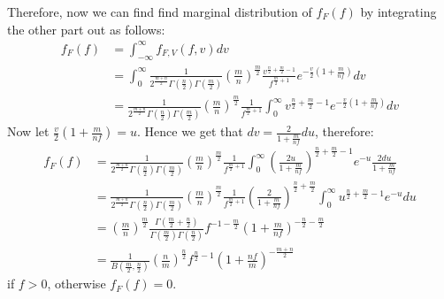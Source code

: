 \documentclass[a4paper]{article}
\begin{document}
Therefore, now we can find find marginal distribution of $f_F\left( f \right) $ by integrating the other part out as follows:
\begin{equation*}
	\begin{split}
		f_F\left( f \right) &=  \int_{-\infty}^{\infty} f_{F,V}\left( f,v \right) dv\\
		&= \int_0^{\infty}  \frac{1}{ 2^{\frac{m+n}{2}}\Gamma\left( \frac{n}{2} \right) \Gamma\left( \frac{m}{2} \right) } \left( \frac{m}{n} \right) ^{\frac{m}{2}} \frac{v^{\frac{n}{2}+\frac{m}{2}-1}}{f^{\frac{m}{2}+1}} e^{-\frac{v}{2}\left( 1+ \frac{m}{nf} \right) }dv\\
		&= \frac{1}{ 2^{\frac{m+n}{2}}\Gamma\left( \frac{n}{2} \right) \Gamma\left( \frac{m}{2} \right) } \left( \frac{m}{n} \right) ^{\frac{m}{2}} \frac{1}{f^{\frac{m}{2}+1}} \int_0^{\infty} v^{\frac{n}{2}+\frac{m}{2}-1}e^{-\frac{v}{2}\left( 1+\frac{m}{nf} \right) }dv
	\end{split}
\end{equation*}
Now let $\frac{v}{2}\left( 1+ \frac{m}{nf} \right) = u$. Hence we get that $dv = \frac{2}{1+\frac{m}{nf}} du$, therefore:
\begin{equation*}
	\begin{split}
		f_F\left( f \right) &= \frac{1}{ 2^{\frac{m+n}{2}}\Gamma\left( \frac{n}{2} \right) \Gamma\left( \frac{m}{2} \right) } \left( \frac{m}{n} \right) ^{\frac{m}{2}} \frac{1}{f^{\frac{m}{2}+1}} \int_0^{\infty} \left( \frac{2u}{1+\frac{m}{nf}} \right) ^{\frac{n}{2}+\frac{m}{2}-1} e^{-u} \frac{2du}{1+\frac{m}{nf}}\\
		&= \frac{1}{ 2^{\frac{m+n}{2}}\Gamma\left( \frac{n}{2} \right) \Gamma\left( \frac{m}{2} \right) } \left( \frac{m}{n} \right) ^{\frac{m}{2}} \frac{1}{f^{\frac{m}{2}+1}} \left( \frac{2}{1+\frac{m}{nf}} \right) ^{\frac{n}{2}+\frac{m}{2}} \int_0^{\infty} u^{\frac{n}{2}+\frac{m}{2}-1}e^{-u}du\\
		&= \left( \frac{m}{n} \right) ^{\frac{m}{2}} \frac{\Gamma\left( \frac{m}{2}+\frac{n}{2} \right) }{\Gamma\left( \frac{m}{2} \right) \Gamma\left( \frac{n}{2} \right) } f^{-1-\frac{m}{2}} \left( 1+\frac{m}{nf} \right) ^{-\frac{n}{2}-\frac{m}{2}}\\
		&= \frac{1}{B\left( \frac{m}{2},\frac{n}{2} \right) } \left( \frac{n}{m} \right) ^{\frac{n}{2}} f^{\frac{n}{2}-1} \left( 1+\frac{nf}{m} \right) ^{-\frac{m+n}{2}}
	\end{split}
\end{equation*}
if $f>0$, otherwise  $f_F\left( f \right) = 0$.
\end{document}
